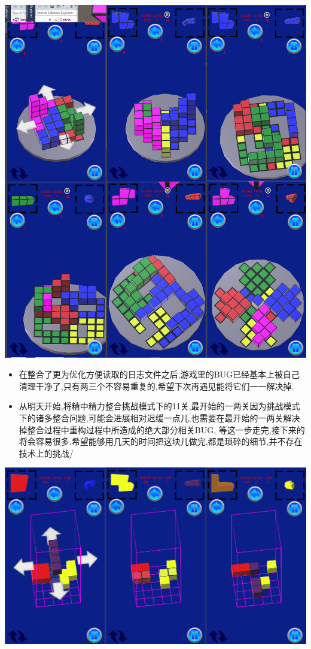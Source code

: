 \documentclass[9pt, b5paper]{article}
\begin{document}
\includegraphics[width=.9\linewidth]{./pic/readme_20221108_222757.png}
\begin{itemize}
\item 在整合了更为优化方便读取的日志文件之后,游戏里的BUG已经基本上被自己清理干净了,只有两三个不容易重复的,希望下次再遇见能将它们一一解决掉.
\item 从明天开始,将精中精力整合挑战模式下的11关,最开始的一两关因为挑战模式下的诸多整合问题,可能会进展相对迟缓一点儿,也需要在最开始的一两关解决掉整合过程中重构过程中所造成的绝大部分相关BUG, 等这一步走完,接下来的将会容易很多.希望能够用几天的时间把这块儿做完,都是琐碎的细节,并不存在技术上的挑战/
\end{itemize}

\includegraphics[width=.9\linewidth]{./pic/readme_20221106_092732.png}
\end{document}
